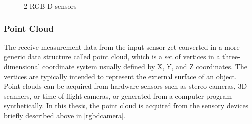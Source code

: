 \begin{figure}%
    \centering
    \qquad
    \caption{2 RGB-D sensors}%
    \label{fig:mycam}%
\end{figure}

\subsubsection{Point Cloud}

 The receive measurement data from the input sensor get converted in a more generic data structure called point cloud, which is a set of vertices in a three-dimensional coordinate system usually defined by X, Y, and Z coordinates. The vertices are typically intended to represent the external surface of an object.
 Point clouds can be acquired from hardware sensors such as stereo cameras, 3D scanners, or time-of-flight cameras, or generated from a computer program synthetically. In this thesis, the point cloud is acquired from the sensory devices briefly described above in \ref{rgbdcamera}.


